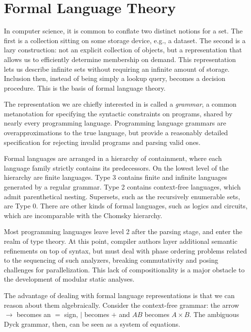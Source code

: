 \chapter{\rm\bfseries Formal Language Theory}
\label{ch:chapter01}

In computer science, it is common to conflate two distinct notions for a set. The first is a collection sitting on some storage device, e.g., a dataset. The second is a lazy construction: not an explicit collection of objects, but a representation that allows us to efficiently determine membership on demand. This representation lets us describe infinite sets without requiring an infinite amount of storage. Inclusion then, instead of being simply a lookup query, becomes a decision procedure. This is the basis of formal language theory.

The representation we are chiefly interested in is called a \textit{grammar}, a common metanotation for specifying the syntactic constraints on programs, shared by nearly every programming language. Programming language grammars are overapproximations to the true language, but provide a reasonably detailed specification for rejecting invalid programs and parsing valid ones.

Formal languages are arranged in a hierarchy of containment, where each language family strictly contains its predecessors. On the lowest level of the hierarchy are finite languages. Type 3 contains finite and infinite languages generated by a regular grammar. Type 2 contains context-free languages, which admit parenthetical nesting. Supersets, such as the recursively enumerable sets, are Type 0. There are other kinds of formal languages, such as logics and circuits, which are incomparable with the Chomsky hierarchy.

Most programming languages leave level 2 after the parsing stage, and enter the realm of type theory. At this point, compiler authors layer additional semantic refinements on top of syntax, but must deal with phase ordering problems related to the sequencing of such analyzers, breaking commutativity and posing challenges for parallelization. This lack of compositionality is a major obstacle to the development of modular static analyses.

The advantage of dealing with formal language representations is that we can reason about them algebraically. Consider the context-free grammar: the arrow $\rightarrow$ becomes an $=$ sign, $\mid$ becomes $+$ and $AB$ becomes $A \times B$. The ambiguous Dyck grammar, then, can be seen as a system of equations.


